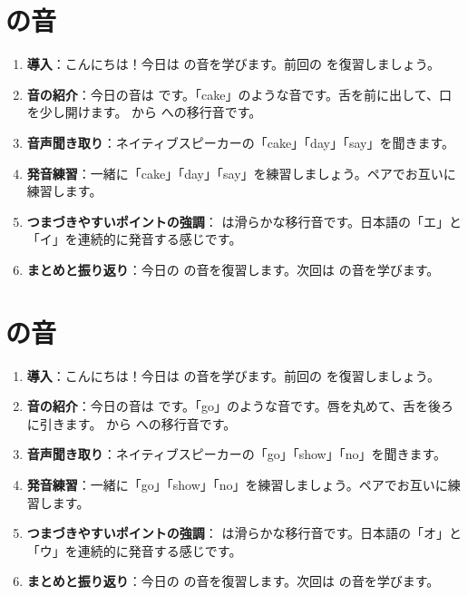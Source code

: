 \documentclass[book,jafontscale=0.9247]{jlreq}
\begin{document}
\section{ の音}
\begin{enumerate}
    \item \textbf{導入}：こんにちは！今日は  の音を学びます。前回の  を復習しましょう。
    \item \textbf{音の紹介}：今日の音は  です。「cake」のような音です。舌を前に出して、口を少し開けます。  から  への移行音です。
    \item \textbf{音声聞き取り}：ネイティブスピーカーの「cake」「day」「say」を聞きます。
    \item \textbf{発音練習}：一緒に「cake」「day」「say」を練習しましょう。ペアでお互いに練習します。
    \item \textbf{つまづきやすいポイントの強調}：  は滑らかな移行音です。日本語の「エ」と「イ」を連続的に発音する感じです。
    \item \textbf{まとめと振り返り}：今日の  の音を復習します。次回は  の音を学びます。
\end{enumerate}

\section{ の音}
\begin{enumerate}
    \item \textbf{導入}：こんにちは！今日は  の音を学びます。前回の  を復習しましょう。
    \item \textbf{音の紹介}：今日の音は  です。「go」のような音です。唇を丸めて、舌を後ろに引きます。  から  への移行音です。
    \item \textbf{音声聞き取り}：ネイティブスピーカーの「go」「show」「no」を聞きます。
    \item \textbf{発音練習}：一緒に「go」「show」「no」を練習しましょう。ペアでお互いに練習します。
    \item \textbf{つまづきやすいポイントの強調}：  は滑らかな移行音です。日本語の「オ」と「ウ」を連続的に発音する感じです。
    \item \textbf{まとめと振り返り}：今日の  の音を復習します。次回は  の音を学びます。
\end{enumerate}
\end{document}

